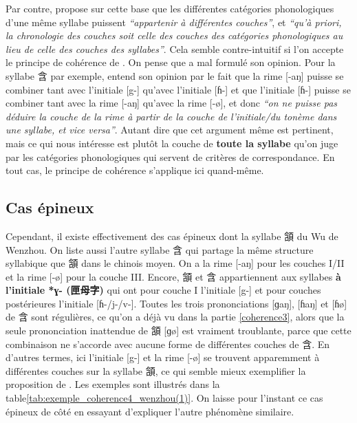 \documentclass{scrbook}
\newcounter{c}[subsubsection]
\newcommand{\illustre}{Les exemples sont illustrés dans la table\xspace}
\newcommand{\termyyx}[1]{\textbf{#1}}
\begin{document}
\begin{sloppypar}

Par contre, \textcite[126--129]{Chen2005couche} propose sur cette base que les différentes catégories phonologiques d'une même syllabe puissent \textit{``appartenir à différentes couches''}, et \textit{``qu'à priori, la chronologie des couches soit celle des couches des catégories phonologiques au lieu de celle des couches des syllabes''}. Cela semble contre-intuitif si l'on accepte le principe de cohérence de \textcite[15]{Sagart2001hani}. On pense que \citeauthor{Chen2005couche} a mal formulé son opinion. Pour la syllabe 含 par exemple, \citeauthor{Chen2005couche} entend son opinion par le fait que la rime [-aŋ] puisse se combiner tant avec l'initiale [g-] qu'avec l'initiale [ɦ-] et que l'initiale [ɦ-] puisse se combiner tant avec la rime [-aŋ] qu'avec la rime [-ø], et donc \textit{``on ne puisse pas déduire la couche de la rime à partir de la couche de l'initiale/du tonème dans une syllabe, et vice versa''}. Autant dire que cet argument même est pertinent, mais ce qui nous intéresse est plutôt la couche de \textbf{toute la syllabe} qu'on juge par les catégories phonologiques qui servent de critères de correspondance. En tout cas, le principe de cohérence s'applique ici quand-même. 

\subsection{Cas épineux}\label{coherence4}
Cependant, il existe effectivement des cas épineux dont la syllabe 頷 du Wu de Wenzhou. On liste aussi l'autre syllabe 含 qui partage la même structure syllabique que 頷 dans le chinois moyen. On a la rime [-aŋ] pour les couches I/II et la rime [-ø] pour la couche III. Encore, 頷 et 含 appartiennent aux syllabes \termyyx{à l'initiale *ɣ- (匣母字)} qui ont pour couche I l'initiale [g-] et pour couches postérieures l'initiale [ɦ-/j-/v-]. Toutes les trois prononciations [ɡaŋ], [ɦaŋ] et [ɦø] de 含 sont régulières, ce qu'on a déjà vu dans la partie \ref{coherence3}, alors que la seule prononciation inattendue de 頷 [ɡø] est vraiment troublante, parce que cette combinaison ne s'accorde avec aucune forme de différentes couches de 含. En d'autres termes, ici l'initiale [g-] et la rime [-ø] se trouvent apparemment à différentes couches sur la syllabe 頷, ce qui semble mieux exemplifier la proposition de \textcite[126--129]{Chen2005couche}. \illustre \ref{tab:exemple_coherence4_wenzhou(1)}. On laisse pour l'instant ce cas épineux de côté en essayant d'expliquer l'autre phénomène similaire.%


\end{sloppypar}
\end{document}
